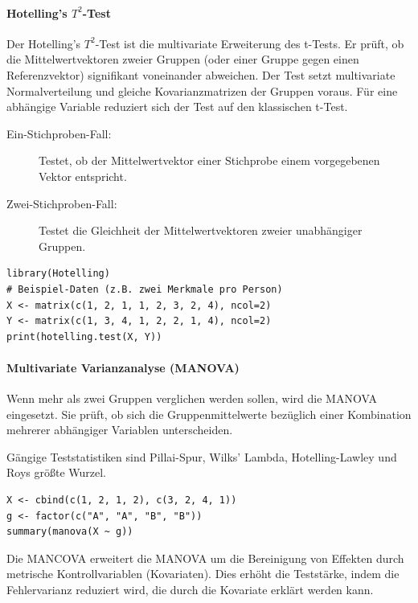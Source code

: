 \documentclass[10pt,twocolumn]{scrartcl}
\begin{document}
\paragraph{Hotelling's $T^2$-Test}

Der Hotelling's $T^2$-Test ist die multivariate Erweiterung des t-Tests. Er prüft, ob die Mittelwertvektoren zweier Gruppen (oder einer Gruppe gegen einen Referenzvektor) signifikant voneinander abweichen.
Der Test setzt multivariate Normalverteilung und gleiche Kovarianzmatrizen der Gruppen voraus.
Für eine abhängige Variable reduziert sich der Test auf den klassischen t-Test.

\begin{description}
\item[Ein-Stichproben-Fall:] Testet, ob der Mittelwertvektor einer Stichprobe einem vorgegebenen Vektor entspricht.
\item[Zwei-Stichproben-Fall:] Testet die Gleichheit der Mittelwertvektoren zweier unabhängiger Gruppen.
\end{description}

\begin{lstlisting}
library(Hotelling)
# Beispiel-Daten (z.B. zwei Merkmale pro Person)
X <- matrix(c(1, 2, 1, 1, 2, 3, 2, 4), ncol=2)
Y <- matrix(c(1, 3, 4, 1, 2, 2, 1, 4), ncol=2)
print(hotelling.test(X, Y))
\end{lstlisting}

\paragraph{Multivariate Varianzanalyse (MANOVA)}

Wenn mehr als zwei Gruppen verglichen werden sollen, wird die MANOVA eingesetzt. Sie prüft, ob sich die Gruppenmittelwerte bezüglich einer Kombination mehrerer abhängiger Variablen unterscheiden.

Gängige Teststatistiken sind Pillai-Spur, Wilks' Lambda, Hotelling-Lawley und Roys größte Wurzel.

\begin{lstlisting}
X <- cbind(c(1, 2, 1, 2), c(3, 2, 4, 1))
g <- factor(c("A", "A", "B", "B"))
summary(manova(X ~ g))
\end{lstlisting}

Die MANCOVA erweitert die MANOVA um die Bereinigung von Effekten durch metrische Kontrollvariablen (Kovariaten). Dies erhöht die Teststärke, indem die Fehlervarianz reduziert wird, die durch die Kovariate erklärt werden kann.
\end{document}
